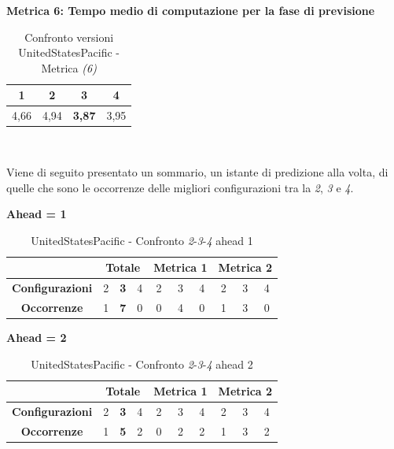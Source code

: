\documentclass[12pt,a4paper,oneside,openright]{book}
\begin{document}
\medskip

\textbf{Metrica 6: Tempo medio di computazione per la fase di previsione}

\medskip

\begin{table}[H]
\centering
\begin{tabular}[H]{|c|c|c|c|}
\hline
1 & 2 & 3 & 4\\
\hline
4,66 & 4,94 & \textbf{3,87} & 3,95\\ 
\hline
\end{tabular} \\
\caption{Confronto versioni UnitedStatesPacific - Metrica \textit{(6)}}
\end{table}

\newpage

Viene di seguito presentato un sommario, un istante di predizione alla volta, di quelle che sono le occorrenze delle migliori configurazioni tra la \textit{2}, \textit{3} e \textit{4}.

\medskip
\textbf{Ahead = 1}

\begin{table}[H]
\centering
\begin{tabular}{|c|c|c|c|c|c|c|c|c|c|}
\hline
 & \multicolumn{3}{|c|}{\textbf{Totale}} & \multicolumn{3}{|c|}{\textbf{Metrica 1}} & \multicolumn{3}{|c|}{\textbf{Metrica 2}} \\
\hline
\textbf{Configurazioni} & 2 & \textbf{3} & 4 & 2 & 3 & 4 & 2 & 3 & 4 \\
\hline
\textbf{Occorrenze} & 1 & \textbf{7} & 0 & 0 & 4 & 0 & 1 & 3 & 0 \\
\hline
\end{tabular}
\caption{UnitedStatesPacific - Confronto \textit{2}-\textit{3}-\textit{4} ahead 1}
\end{table}

\medskip
\textbf{Ahead = 2}

\begin{table}[H]
\centering
\begin{tabular}{|c|c|c|c|c|c|c|c|c|c|}
\hline
 & \multicolumn{3}{|c|}{\textbf{Totale}} & \multicolumn{3}{|c|}{\textbf{Metrica 1}} & \multicolumn{3}{|c|}{\textbf{Metrica 2}} \\
\hline
\textbf{Configurazioni} & 2 & \textbf{3} & 4 & 2 & 3 & 4 & 2 & 3 & 4 \\
\hline
\textbf{Occorrenze} & 1 & \textbf{5} & 2 & 0 & 2 & 2 & 1 & 3 & 2 \\
\hline
\end{tabular}
\caption{UnitedStatesPacific - Confronto \textit{2}-\textit{3}-\textit{4} ahead 2}
\end{table}
\end{document}
